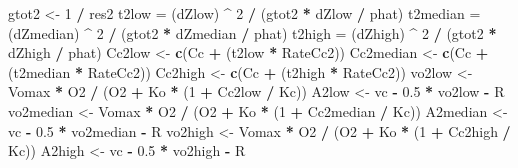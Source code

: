\documentclass[
]{krantz}
\makeatletter
\newenvironment{Shaded}{\begin{snugshade}}{\end{snugshade}}
\newcommand{\DecValTok}[1]{\textcolor[rgb]{0.00,0.00,0.81}{#1}}
\newcommand{\FloatTok}[1]{\textcolor[rgb]{0.00,0.00,0.81}{#1}}
\newcommand{\KeywordTok}[1]{\textcolor[rgb]{0.13,0.29,0.53}{\textbf{#1}}}
\newcommand{\NormalTok}[1]{#1}
\newcommand{\OperatorTok}[1]{\textcolor[rgb]{0.81,0.36,0.00}{\textbf{#1}}}
\newcommand{\StringTok}[1]{\textcolor[rgb]{0.31,0.60,0.02}{#1}}
\newenvironment{kframe}{%
\medskip{}
\setlength{\fboxsep}{.8em}
 \def\at@end@of@kframe{}%
 \ifinner\ifhmode%
  \def\at@end@of@kframe{\end{minipage}}%
  \begin{minipage}{\columnwidth}%
 \fi\fi%
 \def\FrameCommand##1{\hskip\@totalleftmargin \hskip-\fboxsep
 \colorbox{shadecolor}{##1}\hskip-\fboxsep
     \hskip-\linewidth \hskip-\@totalleftmargin \hskip\columnwidth}%
 \MakeFramed {\advance\hsize-\width
   \@totalleftmargin\z@ \linewidth\hsize
   \@setminipage}}%
 {\par\unskip\endMakeFramed%
 \at@end@of@kframe}
\renewenvironment{Shaded}{\begin{kframe}}{\end{kframe}}
\makeatother
\begin{document}
\begin{Shaded}
\begin{Highlighting}[]
\NormalTok{gtot2 <-}\StringTok{ }\DecValTok{1} \OperatorTok{/}\StringTok{ }\NormalTok{res2}
\NormalTok{t2low =}\StringTok{ }\NormalTok{(dZlow) }\OperatorTok{^}\StringTok{ }\DecValTok{2} \OperatorTok{/}\StringTok{ }\NormalTok{(gtot2 }\OperatorTok{*}\StringTok{ }\NormalTok{dZlow }\OperatorTok{/}\StringTok{ }\NormalTok{phat)}
\NormalTok{t2median =}\StringTok{ }\NormalTok{(dZmedian) }\OperatorTok{^}\StringTok{ }\DecValTok{2} \OperatorTok{/}\StringTok{ }\NormalTok{(gtot2 }\OperatorTok{*}\StringTok{ }\NormalTok{dZmedian }\OperatorTok{/}\StringTok{ }\NormalTok{phat)}
\NormalTok{t2high =}\StringTok{ }\NormalTok{(dZhigh) }\OperatorTok{^}\StringTok{ }\DecValTok{2} \OperatorTok{/}\StringTok{ }\NormalTok{(gtot2 }\OperatorTok{*}\StringTok{ }\NormalTok{dZhigh }\OperatorTok{/}\StringTok{ }\NormalTok{phat)}
\NormalTok{Cc2low <-}\StringTok{ }\KeywordTok{c}\NormalTok{(Cc }\OperatorTok{+}\StringTok{ }\NormalTok{(t2low }\OperatorTok{*}\StringTok{ }\NormalTok{RateCc2))}
\NormalTok{Cc2median <-}\StringTok{ }\KeywordTok{c}\NormalTok{(Cc }\OperatorTok{+}\StringTok{ }\NormalTok{(t2median }\OperatorTok{*}\StringTok{ }\NormalTok{RateCc2))}
\NormalTok{Cc2high <-}\StringTok{ }\KeywordTok{c}\NormalTok{(Cc }\OperatorTok{+}\StringTok{ }\NormalTok{(t2high }\OperatorTok{*}\StringTok{ }\NormalTok{RateCc2))}
\NormalTok{vo2low <-}\StringTok{ }\NormalTok{Vomax }\OperatorTok{*}\StringTok{ }\NormalTok{O2 }\OperatorTok{/}\StringTok{ }\NormalTok{(O2 }\OperatorTok{+}\StringTok{ }\NormalTok{Ko }\OperatorTok{*}\StringTok{ }\NormalTok{(}\DecValTok{1} \OperatorTok{+}\StringTok{ }\NormalTok{Cc2low }\OperatorTok{/}\StringTok{ }\NormalTok{Kc)) }
\NormalTok{A2low <-}\StringTok{ }\NormalTok{vc }\OperatorTok{-}\StringTok{ }\FloatTok{0.5} \OperatorTok{*}\StringTok{ }\NormalTok{vo2low }\OperatorTok{-}\StringTok{ }\NormalTok{R }
\NormalTok{vo2median <-}\StringTok{ }\NormalTok{Vomax }\OperatorTok{*}\StringTok{ }\NormalTok{O2 }\OperatorTok{/}\StringTok{ }\NormalTok{(O2 }\OperatorTok{+}\StringTok{ }\NormalTok{Ko }\OperatorTok{*}\StringTok{ }\NormalTok{(}\DecValTok{1} \OperatorTok{+}\StringTok{ }\NormalTok{Cc2median }\OperatorTok{/}\StringTok{ }\NormalTok{Kc)) }
\NormalTok{A2median <-}\StringTok{ }\NormalTok{vc }\OperatorTok{-}\StringTok{ }\FloatTok{0.5} \OperatorTok{*}\StringTok{ }\NormalTok{vo2median }\OperatorTok{-}\StringTok{ }\NormalTok{R }
\NormalTok{vo2high <-}\StringTok{ }\NormalTok{Vomax }\OperatorTok{*}\StringTok{ }\NormalTok{O2 }\OperatorTok{/}\StringTok{ }\NormalTok{(O2 }\OperatorTok{+}\StringTok{ }\NormalTok{Ko }\OperatorTok{*}\StringTok{ }\NormalTok{(}\DecValTok{1} \OperatorTok{+}\StringTok{ }\NormalTok{Cc2high }\OperatorTok{/}\StringTok{ }\NormalTok{Kc)) }
\NormalTok{A2high <-}\StringTok{ }\NormalTok{vc }\OperatorTok{-}\StringTok{ }\FloatTok{0.5} \OperatorTok{*}\StringTok{ }\NormalTok{vo2high }\OperatorTok{-}\StringTok{ }\NormalTok{R }


\end{Highlighting}
\end{Shaded}
\end{document}
